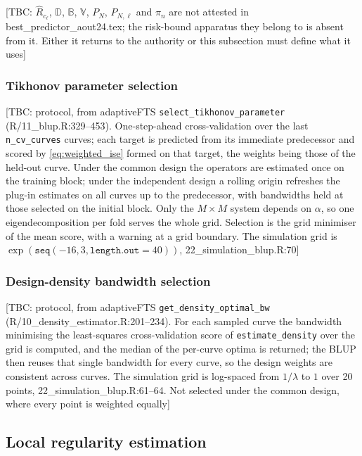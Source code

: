 \color{magenta}
[TBC: $\widehat{R}_{c_\ell}$, $\mathbb{D}$, $\mathbb{B}$, $\mathbb{V}$, $P_N$, $P_{N,\ell}$ and $\pi_n$ are not attested in best\_predictor\_aout24.tex; the risk-bound apparatus they belong to is absent from it. Either it returns to the authority or this subsection must define what it uses]
\color{black}

\subsubsection{\color{magenta}Tikhonov parameter selection\color{black}}

\color{magenta}
[TBC: protocol, from adaptiveFTS \texttt{select\_tikhonov\_parameter} (R/11\_blup.R:329--453). One-step-ahead cross-validation over the last \texttt{n\_cv\_curves} curves; each target is predicted from its immediate predecessor and scored by \eqref{eq:weighted_ise} formed on that target, the weights being those of the held-out curve. Under the common design the operators are estimated once on the training block; under the independent design a rolling origin refreshes the plug-in estimates on all curves up to the predecessor, with bandwidths held at those selected on the initial block. Only the $M\times M$ system depends on $\alpha$, so one eigendecomposition per fold serves the whole grid. Selection is the grid minimiser of the mean score, with a warning at a grid boundary. The simulation grid is $\exp(\texttt{seq}(-16, 3, \texttt{length.out} = 40))$, 22\_simulation\_blup.R:70]
\color{black}

\subsubsection{\color{magenta}Design-density bandwidth selection\color{black}}

\color{magenta}
[TBC: protocol, from adaptiveFTS \texttt{get\_density\_optimal\_bw} (R/10\_density\_estimator.R:201--234). For each sampled curve the bandwidth minimising the least-squares cross-validation score of \texttt{estimate\_density} over the grid is computed, and the median of the per-curve optima is returned; the BLUP then reuses that single bandwidth for every curve, so the design weights are consistent across curves. The simulation grid is log-spaced from $1/\lambda$ to $1$ over 20 points, 22\_simulation\_blup.R:61--64. Not selected under the common design, where every point is weighted equally]
\color{black}

\subsection{\color{magenta}Local regularity estimation\color{black}}

